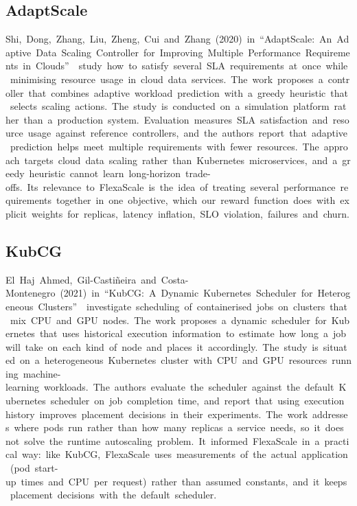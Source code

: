 \documentclass[12pt,a4paper,oneside]{report}
\begin{document}
\subsection{AdaptScale}

Shi,~Dong,~Zhang,~Liu,~Zheng,~Cui~and~Zhang~(2020)~in~``AdaptScale:~An~Adaptive~Data~Scaling~Controller~for~Improving~Multiple~Performance~Requirements~in~Clouds''~\cite{adaptscale}~study~how~to~satisfy~several~SLA~requirements~at~once~while~minimising~resource~usage~in~cloud~data~services.~The~work~proposes~a~controller~that~combines~adaptive~workload~prediction~with~a~greedy~heuristic~that~selects~scaling~actions.~The~study~is~conducted~on~a~simulation~platform~rather~than~a~production~system.~Evaluation~measures~SLA~satisfaction~and~resource~usage~against~reference~controllers,~and~the~authors~report~that~adaptive~prediction~helps~meet~multiple~requirements~with~fewer~resources.~The~approach~targets~cloud~data~scaling~rather~than~Kubernetes~microservices,~and~a~greedy~heuristic~cannot~learn~long-horizon~trade-offs.~Its~relevance~to~FlexaScale~is~the~idea~of~treating~several~performance~requirements~together~in~one~objective,~which~our~reward~function~does~with~explicit~weights~for~replicas,~latency~inflation,~SLO~violation,~failures~and~churn.


\clearpage

\subsection{KubCG}

El~Haj~Ahmed,~Gil-Castiñeira~and~Costa-Montenegro~(2021)~in~``KubCG:~A~Dynamic~Kubernetes~Scheduler~for~Heterogeneous~Clusters''~\cite{kubcg}~investigate~scheduling~of~containerised~jobs~on~clusters~that~mix~CPU~and~GPU~nodes.~The~work~proposes~a~dynamic~scheduler~for~Kubernetes~that~uses~historical~execution~information~to~estimate~how~long~a~job~will~take~on~each~kind~of~node~and~places~it~accordingly.~The~study~is~situated~on~a~heterogeneous~Kubernetes~cluster~with~CPU~and~GPU~resources~running~machine-learning~workloads.~The~authors~evaluate~the~scheduler~against~the~default~Kubernetes~scheduler~on~job~completion~time,~and~report~that~using~execution~history~improves~placement~decisions~in~their~experiments.~The~work~addresses~where~pods~run~rather~than~how~many~replicas~a~service~needs,~so~it~does~not~solve~the~runtime~autoscaling~problem.~It~informed~FlexaScale~in~a~practical~way:~like~KubCG,~FlexaScale~uses~measurements~of~the~actual~application~(pod~start-up~times~and~CPU~per~request)~rather~than~assumed~constants,~and~it~keeps~placement~decisions~with~the~default~scheduler.
\end{document}
